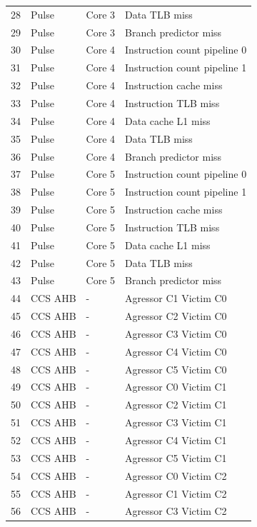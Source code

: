 \begin{center}
\begin{longtable}{|l|l|l|l|}
28  & Pulse   & Core 3 &  Data TLB miss \\
29  & Pulse   & Core 3 &  Branch predictor miss \\
30  & Pulse   & Core 4 &  Instruction count pipeline 0 \\
31  & Pulse   & Core 4 &  Instruction count pipeline 1 \\
32  & Pulse   & Core 4 &  Instruction cache miss \\
33  & Pulse   & Core 4 &  Instruction TLB miss \\
34  & Pulse   & Core 4 &  Data cache L1 miss \\
35  & Pulse   & Core 4 &  Data TLB miss \\
36  & Pulse   & Core 4 &  Branch predictor miss \\
37  & Pulse   & Core 5 &  Instruction count pipeline 0 \\
38  & Pulse   & Core 5 &  Instruction count pipeline 1 \\
39  & Pulse   & Core 5 &  Instruction cache miss \\
40  & Pulse   & Core 5 &  Instruction TLB miss \\
41  & Pulse   & Core 5 &  Data cache L1 miss \\
42  & Pulse   & Core 5 &  Data TLB miss \\
43  & Pulse   & Core 5 &  Branch predictor miss \\
44  & CCS AHB &  -     &  Agressor C1 Victim C0\\
45  & CCS AHB &  -     &  Agressor C2 Victim C0\\
46  & CCS AHB &  -     &  Agressor C3 Victim C0\\
47  & CCS AHB &  -     &  Agressor C4 Victim C0\\
48  & CCS AHB &  -     &  Agressor C5 Victim C0\\
49  & CCS AHB &  -     &  Agressor C0 Victim C1\\
50  & CCS AHB &  -     &  Agressor C2 Victim C1\\
51  & CCS AHB &  -     &  Agressor C3 Victim C1\\
52  & CCS AHB &  -     &  Agressor C4 Victim C1\\
53  & CCS AHB &  -     &  Agressor C5 Victim C1\\
54  & CCS AHB &  -     &  Agressor C0 Victim C2\\
55  & CCS AHB &  -     &  Agressor C1 Victim C2\\
56  & CCS AHB &  -     &  Agressor C3 Victim C2\\

\end{longtable}
\end{center}
